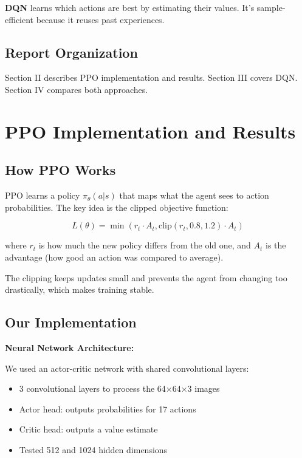 \documentclass[conference]{IEEEtran}
\begin{document}
\textbf{DQN} learns which actions are best by estimating their values. It's sample-efficient because it reuses past experiences.

\subsection{Report Organization}

Section II describes PPO implementation and results. Section III covers DQN. Section IV compares both approaches.

\section{PPO Implementation and Results}

\subsection{How PPO Works}

PPO learns a policy $\pi_\theta(a|s)$ that maps what the agent sees to action probabilities. The key idea is the clipped objective function:

\begin{equation}
L(\theta) = \min(r_t \cdot A_t, \text{clip}(r_t, 0.8, 1.2) \cdot A_t)
\end{equation}

where $r_t$ is how much the new policy differs from the old one, and $A_t$ is the advantage (how good an action was compared to average).

The clipping keeps updates small and prevents the agent from changing too drastically, which makes training stable.

\subsection{Our Implementation}

\textbf{Neural Network Architecture:}

We used an actor-critic network with shared convolutional layers:
\begin{itemize}
    \item 3 convolutional layers to process the 64×64×3 images
    \item Actor head: outputs probabilities for 17 actions
    \item Critic head: outputs a value estimate
    \item Tested 512 and 1024 hidden dimensions
\end{itemize}
\end{document}

